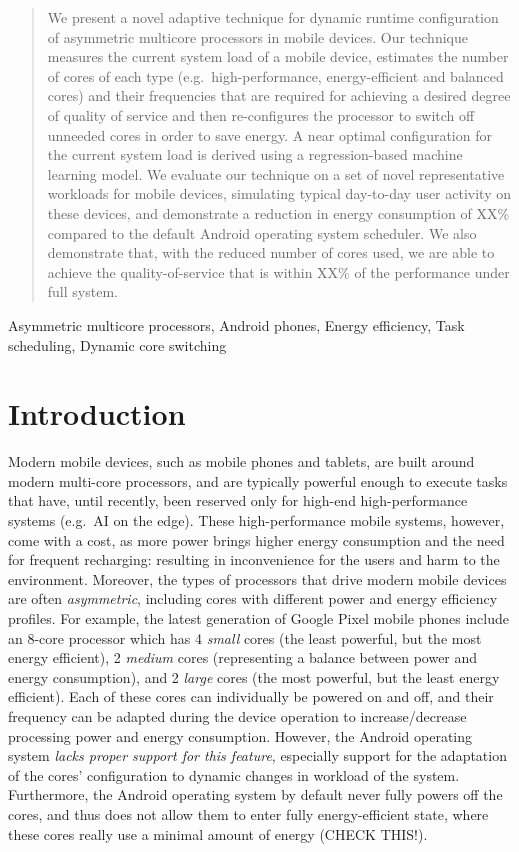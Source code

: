\documentclass[conference]{IEEEtran}
\begin{document}
\begin{abstract}
We present a novel adaptive technique for dynamic runtime configuration of asymmetric multicore processors in mobile devices. Our technique measures the current system load of a mobile device, estimates the number of cores of each type (e.g.~high-performance, energy-efficient and balanced cores) and their frequencies that are required for achieving a desired degree of quality of service and then re-configures the processor to switch off unneeded cores in order to save energy. A near optimal configuration for the current system load is derived using a regression-based machine learning model. We evaluate our technique on a set of novel representative workloads for mobile devices, simulating typical day-to-day user activity on these devices, and demonstrate a reduction in energy consumption of XX\% compared to the default Android operating system scheduler. We also demonstrate that, with the reduced number of cores used,  we are able to achieve the quality-of-service that is within XX\% of the performance under full system.
\end{abstract}

\begin{IEEEkeywords}
Asymmetric multicore processors, Android phones, Energy efficiency, Task scheduling, Dynamic core switching
\end{IEEEkeywords}

\section{Introduction}
Modern mobile devices, such as mobile phones and tablets, are built around modern multi-core processors, and are typically powerful enough to execute tasks that have, until recently, been reserved only for high-end high-performance systems (e.g.~AI on the edge). These high-performance mobile systems, however, come with a cost, as more power brings higher energy consumption and the need for frequent recharging: resulting in inconvenience for the users and harm to the environment. Moreover, the types of processors that drive modern mobile devices are often \emph{asymmetric}, including cores with different power and energy efficiency profiles. For example, the latest generation of Google Pixel mobile phones include an 8-core processor which has 4 \emph{small} cores (the least powerful, but the most energy efficient), 2 \emph{medium} cores (representing a balance between power and energy consumption), and 2 \emph{large} cores (the most powerful, but the least energy efficient). Each of these cores can individually be powered on and off, and their frequency can be adapted during the device operation to increase/decrease processing power and energy consumption. However, the Android operating system \emph{lacks proper support for this feature}, especially support for the adaptation of the cores' configuration to dynamic changes in workload of the system. Furthermore, the Android operating system by default never fully powers off the cores, and thus does not allow them to enter fully energy-efficient state, where these cores really use a minimal amount of energy (CHECK THIS!).
\end{document}
